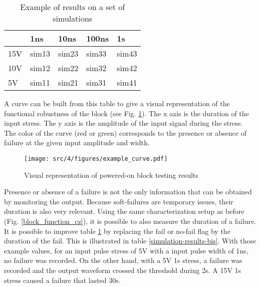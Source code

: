 \begin{table}[!h]
\centering
\begin{tabular}{@{}lllll@{}}
\toprule
    & 1ns                          & 10ns                         & 100ns                        & 1\textmugreek{}s             \\ \midrule
15V & {\color[HTML]{FE0000} sim13} & {\color[HTML]{FE0000} sim23} & {\color[HTML]{FE0000} sim33} & {\color[HTML]{FE0000} sim43} \\
10V & {\color[HTML]{32CB00} sim12} & {\color[HTML]{FE0000} sim22} & {\color[HTML]{FE0000} sim32} & {\color[HTML]{FE0000} sim42} \\
5V  & {\color[HTML]{32CB00} sim11} & {\color[HTML]{32CB00} sim21} & {\color[HTML]{32CB00} sim31} & {\color[HTML]{FE0000} sim41} \\
\bottomrule
\end{tabular}
\caption{Example of results on a set of simulations}
\label{simulation-results}
\end{table}

A curve can be built from this table to give a visual representation of the functional robustness of the block (see Fig. \ref{wb_cz_curve_example}).
The x axis is the duration of the input stress.
The y axis is the amplitude of the input signal during the stress.
The color of the curve (red or green) corresponds to the presence or absence of failure at the given input amplitude and width.

\begin{figure}[!h]
  \centering
  \texttt{[image: src/4/figures/example\_curve.pdf]}
  \caption{Visual representation of powered-on block testing results}
  \label{wb_cz_curve_example}
\end{figure}

Presence or absence of a failure is not the only information that can be obtained by monitoring the output.
Because soft-failures are temporary issues, their duration is also very relevant.
Using the same characterization setup as before (Fig. \ref{block_function_cz}), it is possible to also measure the duration of a failure.
It is possible to improve table \ref{simulation-results} by replacing the fail or no-fail flag by the duration of the fail.
This is illustrated in table \ref{simulation-results-bis}.
With those example values, for an input pulse stress of 5V with a input pulse width of 1ns, no failure was recorded.
On the other hand, with a 5V 1\textmu{}s stress, a failure was recorded and the output waveform crossed the threshold during 2\textmu{}s.
A 15V 1\textmu{}s stress caused a failure that lasted 30\textmu{}s.

